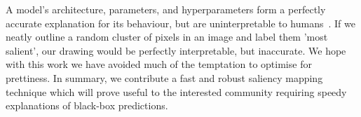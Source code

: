 \documentclass{article} %
\begin{document}
A model's architecture, parameters, and hyperparameters form a perfectly accurate explanation for its behaviour, but are uninterpretable to humans~\cite{Fong2019-vk}. If we neatly outline a random cluster of pixels in an image and label them 'most salient', our drawing would be perfectly interpretable, but inaccurate. We hope with this work we have avoided much of the temptation to optimise for prettiness. In summary, we contribute a fast and robust saliency mapping technique which will prove useful to the interested community requiring speedy explanations of black-box predictions.


\end{document}
